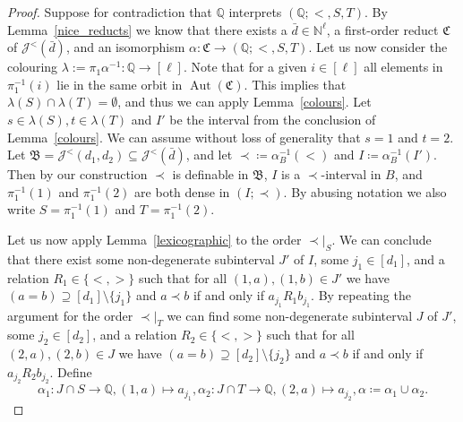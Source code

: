 \documentclass{amsart}
\theoremstyle{definition}
\theoremstyle{remark}
\numberwithin{equation}{section}
\newcommand{\aut}{\operatorname{Aut}}
\newcommand\johnord[1]{\mathcal{J}^{<}(#1)}
\newcommand{\fb}{\mathfrak{B}}
\newcommand{\fc}{\mathfrak{C}}
\begin{document}
\begin{proof}%
	Suppose for contradiction that $\mathbb{Q}$ interprets $(\mathbb{Q};<,S,T)$. By Lemma~\ref{nice_reducts} we know that there exists a $\bar{d}\in {\mathbb N}^{\ell}$, 
    a first-order reduct $\fc$ of  
    $\johnord{{\bar{d}}}$,
    and an isomorphism $\alpha \colon \fc \to (\mathbb{Q};<,S,T)$. %
    Let us now consider the colouring $\lambda := \pi_1 \alpha^{-1} \colon {\mathbb Q} \to [\ell]$. Note that for a given $i \in [\ell]$ all elements in $\pi_1^{-1}(i)$ lie in the same orbit in $\aut(\fc)$. This implies that $\lambda(S)\cap \lambda(T)=\emptyset$, and thus we can apply Lemma~\ref{colours}. Let $s\in {\lambda(S)},t\in {\lambda(T)}$ and $I'$ be the interval from the conclusion of Lemma~\ref{colours}. We can assume without loss of generality that $s=1$ and $t=2$. Let $\fb=\johnord{d_1,d_2}\subseteq \johnord{\bar{d}}$, and let $\prec\coloneqq \alpha_B^{-1}(<)$ and $I\coloneqq \alpha_B^{-1}(I')$. Then by our construction $\prec$ is definable in $\fb$, $I$ is a $\prec$-interval in $B$, and $\pi_1^{-1}(1)$ and $\pi_1^{-1}(2)$ are both dense in $(I;\prec)$. By abusing notation we also write $S=\pi_1^{-1}(1)$ and $T=\pi_1^{-1}(2)$.
	
	
	Let us now apply Lemma~\ref{lexicographic} to the order ${\prec}|_S$. 
    We can conclude that there exist some non-degenerate subinterval $J'$ of $I$, some $j_1\in [d_1]$, and a relation $R_1\in \{<,>\}$ such that for all $(1,a),(1,b)\in J'$ we have $(a=b)\supseteq [d_1]\setminus \{j_1\}$ and $a\prec b$ if and only if $a_{j_1}R_1b_{j_1}$. By repeating the argument for the order ${\prec}|_T$ we can find some non-degenerate subinterval $J$ of $J'$, some $j_2\in [d_2]$, and a relation $R_2\in \{<,>\}$ such that for all $(2,a),(2,b)\in J$ we have $(a=b)\supseteq [d_2]\setminus \{j_2\}$ and $a\prec b$ if and only if $a_{j_2}R_2b_{j_2}$. Define 
\[
\alpha_1 \colon J\cap S\rightarrow \mathbb{Q}, (1,a)\mapsto a_{j_1}, \alpha_2 \colon  J\cap T\rightarrow \mathbb{Q}, (2,a)\mapsto a_{j_2}, \alpha\coloneqq \alpha_1\cup \alpha_2.
\]


\end{proof}
\end{document}
